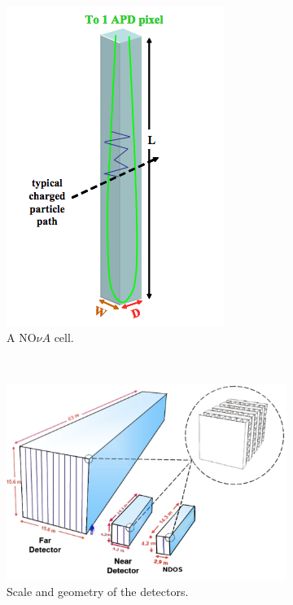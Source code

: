 \begin{figure}[t]
\begin{subfigure}[t]{0.25\textwidth}
                \includegraphics[height=0.35\textheight]{figures/cell.png}
               \caption{A NO$\nu A$ cell.}
                 \label{cell}
        \end{subfigure}
        ~
\begin{subfigure}[t]{0.75\textwidth}
                \centering
                \includegraphics[height=0.35\textheight]{figures/detectors.pdf}
               \caption{Scale and geometry of the \nova detectors.}
                \label{detector}

        \end{subfigure}
        \caption{}
\end{figure}

